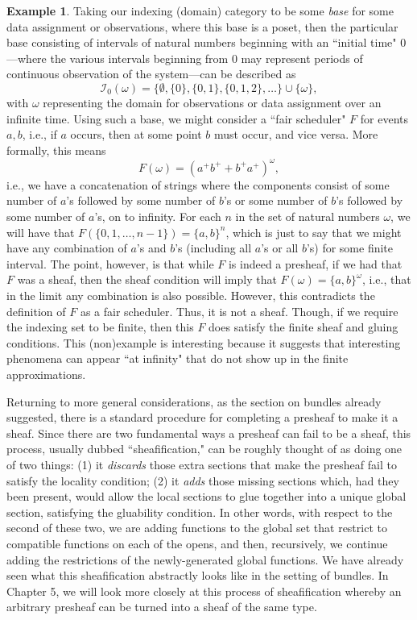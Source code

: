\documentclass[11pt]{book}
\theoremstyle{definition}
\newtheorem{example}{Example}[section]
\theoremstyle{definition}
\theoremstyle{definition}
\theoremstyle{theorem}
\theoremstyle{definition}
\begin{document}
\begin{example}
Taking our indexing (domain) category to be some \textit{base} for some data assignment or observations, where this base is a poset, then the particular base consisting of intervals of natural numbers beginning with an ``initial time" 0---where the various intervals beginning from 0 may represent periods of continuous observation of the system---can be described as
\begin{equation*}
\mathscr{I}_0 (\omega) = \{\emptyset, \{0\}, \{0,1\}, \{0,1,2\}, \dots \} \cup \{\omega \},
\end{equation*} 
with $\omega$ representing the domain for observations or data assignment over an infinite time. Using such a base, we might consider a ``fair scheduler" $F$ for events $a,b$, i.e., if $a$ occurs, then at some point $b$ must occur, and vice versa. More formally, this means 
\begin{equation*}
F(\omega) = (a^{+}b^{+} + b^{+}a^{+})^{\omega},
\end{equation*}
 i.e., we have a concatenation of strings where the components consist of some number of $a$'s followed by some number of $b$'s or some number of $b$'s followed by some number of $a$'s, on to infinity. For each $n$ in the set of natural numbers $\omega$, we will have that $F(\{0,1,\dots,n-1 \}) = \{a, b\}^n$, which is just to say that we might have any combination of $a$'s and $b$'s (including all $a$'s or all $b$'s) for some finite interval. The point, however, is that while $F$ is indeed a presheaf, if we had that $F$ was a sheaf, then the sheaf condition will imply that $F(\omega) = \{a,b \}^{\omega}$, i.e., that in the limit any combination is also possible.  However, this contradicts the definition of $F$ as a fair scheduler. Thus, it is not a sheaf. Though, if we require the indexing set to be finite, then this $F$ does satisfy the finite sheaf and gluing conditions. This (non)example is interesting because it suggests that interesting phenomena can appear ``at infinity" that do not show up in the finite approximations. 
\end{example} 
Returning to more general considerations, as the section on bundles already suggested, there is a standard procedure for completing a presheaf to make it a sheaf. Since there are two fundamental ways a presheaf can fail to be a sheaf, this process, usually dubbed ``sheafification," can be roughly thought of as doing one of two things: (1) it \textit{discards} those extra sections that make the presheaf fail to satisfy the locality condition; (2) it \textit{adds} those missing sections which, had they been present, would allow the local sections to glue together into a unique global section, satisfying the gluability condition.  In other words, with respect to the second of these two, we are adding functions to the global set that restrict to compatible functions on each of the opens, and then, recursively, we continue adding the restrictions of the newly-generated global functions. We have already seen what this sheafification abstractly looks like in the setting of bundles. In Chapter 5, we will look more closely at this process of sheafification whereby an arbitrary presheaf can be turned into a sheaf of the same type. \par 
\end{document}
